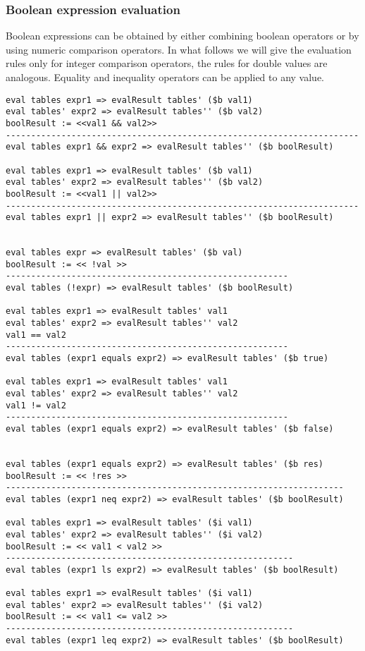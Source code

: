 \subsubsection{Boolean expression evaluation}
Boolean expressions can be obtained by either combining boolean operators or by using numeric comparison operators. In what follows we will give the evaluation rules only for integer comparison operators, the rules for double values are analogous. Equality and inequality operators can be applied to any value.

\begin{lstlisting}
eval tables expr1 => evalResult tables' ($b val1)
eval tables' expr2 => evalResult tables'' ($b val2)
boolResult := <<val1 && val2>>
----------------------------------------------------------------------
eval tables expr1 && expr2 => evalResult tables'' ($b boolResult)

eval tables expr1 => evalResult tables' ($b val1)
eval tables' expr2 => evalResult tables'' ($b val2)
boolResult := <<val1 || val2>>
----------------------------------------------------------------------
eval tables expr1 || expr2 => evalResult tables'' ($b boolResult)


eval tables expr => evalResult tables' ($b val)
boolResult := << !val >>
--------------------------------------------------------
eval tables (!expr) => evalResult tables' ($b boolResult)

eval tables expr1 => evalResult tables' val1
eval tables' expr2 => evalResult tables'' val2
val1 == val2
--------------------------------------------------------
eval tables (expr1 equals expr2) => evalResult tables' ($b true)

eval tables expr1 => evalResult tables' val1
eval tables' expr2 => evalResult tables'' val2
val1 != val2
--------------------------------------------------------
eval tables (expr1 equals expr2) => evalResult tables' ($b false)


eval tables (expr1 equals expr2) => evalResult tables' ($b res)
boolResult := << !res >>
-------------------------------------------------------------------
eval tables (expr1 neq expr2) => evalResult tables' ($b boolResult)

eval tables expr1 => evalResult tables' ($i val1)
eval tables' expr2 => evalResult tables'' ($i val2)
boolResult := << val1 < val2 >>
---------------------------------------------------------
eval tables (expr1 ls expr2) => evalResult tables' ($b boolResult)

eval tables expr1 => evalResult tables' ($i val1)
eval tables' expr2 => evalResult tables'' ($i val2)
boolResult := << val1 <= val2 >>
---------------------------------------------------------
eval tables (expr1 leq expr2) => evalResult tables' ($b boolResult)


\end{lstlisting}
